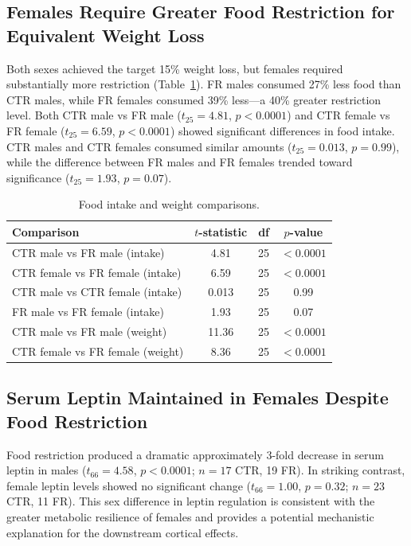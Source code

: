 \documentclass[11pt]{article}
\begin{document}
\subsection{Females Require Greater Food Restriction for Equivalent Weight Loss}

Both sexes achieved the target 15\% weight loss, but females required substantially more restriction (Table~\ref{tab:food}). FR males consumed 27\% less food than CTR males, while FR females consumed 39\% less---a 40\% greater restriction level. Both CTR male vs FR male ($t_{25} = 4.81$, $p < 0.0001$) and CTR female vs FR female ($t_{25} = 6.59$, $p < 0.0001$) showed significant differences in food intake. CTR males and CTR females consumed similar amounts ($t_{25} = 0.013$, $p = 0.99$), while the difference between FR males and FR females trended toward significance ($t_{25} = 1.93$, $p = 0.07$).

\begin{table}[h]
\centering
\caption{Food intake and weight comparisons.}
\label{tab:food}
\begin{tabular}{lccc}
\toprule
Comparison & $t$-statistic & df & $p$-value \\
\midrule
CTR male vs FR male (intake) & 4.81 & 25 & $< 0.0001$ \\
CTR female vs FR female (intake) & 6.59 & 25 & $< 0.0001$ \\
CTR male vs CTR female (intake) & 0.013 & 25 & 0.99 \\
FR male vs FR female (intake) & 1.93 & 25 & 0.07 \\
CTR male vs FR male (weight) & 11.36 & 25 & $< 0.0001$ \\
CTR female vs FR female (weight) & 8.36 & 25 & $< 0.0001$ \\
\bottomrule
\end{tabular}
\end{table}

\subsection{Serum Leptin Maintained in Females Despite Food Restriction}

Food restriction produced a dramatic approximately 3-fold decrease in serum leptin in males ($t_{66} = 4.58$, $p < 0.0001$; $n = 17$ CTR, 19 FR). In striking contrast, female leptin levels showed no significant change ($t_{66} = 1.00$, $p = 0.32$; $n = 23$ CTR, 11 FR). This sex difference in leptin regulation is consistent with the greater metabolic resilience of females and provides a potential mechanistic explanation for the downstream cortical effects.
\end{document}
